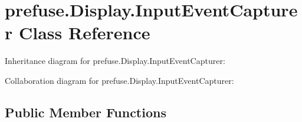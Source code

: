 \hypertarget{classprefuse_1_1_display_1_1_input_event_capturer}{\section{prefuse.\-Display.\-Input\-Event\-Capturer \-Class \-Reference}
\label{classprefuse_1_1_display_1_1_input_event_capturer}
}


\-Inheritance diagram for prefuse.\-Display.\-Input\-Event\-Capturer\-:


\-Collaboration diagram for prefuse.\-Display.\-Input\-Event\-Capturer\-:
\subsection*{\-Public \-Member \-Functions}
